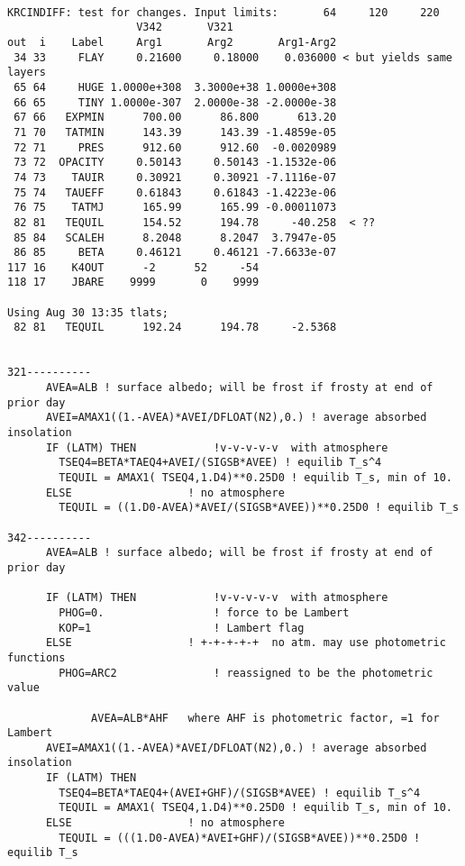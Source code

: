 \documentclass{article}
\begin{document}
 
\vspace{-3.mm} 
\begin{verbatim}

KRCINDIFF: test for changes. Input limits:       64     120     220
                    V342       V321
out  i    Label     Arg1       Arg2       Arg1-Arg2
 34 33     FLAY     0.21600     0.18000    0.036000 < but yields same layers
 65 64     HUGE 1.0000e+308  3.3000e+38 1.0000e+308
 66 65     TINY 1.0000e-307  2.0000e-38 -2.0000e-38
 67 66   EXPMIN      700.00      86.800      613.20
 71 70   TATMIN      143.39      143.39 -1.4859e-05
 72 71     PRES      912.60      912.60  -0.0020989
 73 72  OPACITY     0.50143     0.50143 -1.1532e-06
 74 73    TAUIR     0.30921     0.30921 -7.1116e-07
 75 74   TAUEFF     0.61843     0.61843 -1.4223e-06
 76 75    TATMJ      165.99      165.99 -0.00011073
 82 81   TEQUIL      154.52      194.78     -40.258  < ??
 85 84   SCALEH      8.2048      8.2047  3.7947e-05
 86 85     BETA     0.46121     0.46121 -7.6633e-07
117 16    K4OUT      -2      52     -54
118 17    JBARE    9999       0    9999

Using Aug 30 13:35 tlats; 
 82 81   TEQUIL      192.24      194.78     -2.5368


321----------
      AVEA=ALB ! surface albedo; will be frost if frosty at end of prior day
      AVEI=AMAX1((1.-AVEA)*AVEI/DFLOAT(N2),0.) ! average absorbed insolation
      IF (LATM) THEN            !v-v-v-v-v  with atmosphere
        TSEQ4=BETA*TAEQ4+AVEI/(SIGSB*AVEE) ! equilib T_s^4
        TEQUIL = AMAX1( TSEQ4,1.D4)**0.25D0 ! equilib T_s, min of 10.
      ELSE                  ! no atmosphere
        TEQUIL = ((1.D0-AVEA)*AVEI/(SIGSB*AVEE))**0.25D0 ! equilib T_s

342----------
      AVEA=ALB ! surface albedo; will be frost if frosty at end of prior day

      IF (LATM) THEN            !v-v-v-v-v  with atmosphere
        PHOG=0.                 ! force to be Lambert
        KOP=1                   ! Lambert flag
      ELSE                  ! +-+-+-+-+  no atm. may use photometric functions
        PHOG=ARC2               ! reassigned to be the photometric value

             AVEA=ALB*AHF   where AHF is photometric factor, =1 for Lambert
      AVEI=AMAX1((1.-AVEA)*AVEI/DFLOAT(N2),0.) ! average absorbed insolation
      IF (LATM) THEN
        TSEQ4=BETA*TAEQ4+(AVEI+GHF)/(SIGSB*AVEE) ! equilib T_s^4
        TEQUIL = AMAX1( TSEQ4,1.D4)**0.25D0 ! equilib T_s, min of 10.
      ELSE                  ! no atmosphere
        TEQUIL = (((1.D0-AVEA)*AVEI+GHF)/(SIGSB*AVEE))**0.25D0 ! equilib T_s



\end{verbatim}
\end{document}
